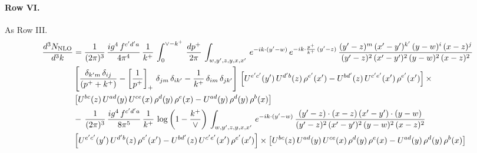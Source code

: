 \documentclass[10pt]{article}
\numberwithin{equation}{section}
\begin{document}
\paragraph{Row VI.}
As Row III.
\begin{align}
    \frac{d^{3}N_{\rm NLO}}{d^{3}k} & =  \frac{1}{(2\pi)^{3}}\, \frac{ig^{4}\,f^{c'd'a}}{4\pi^{4}}\, \frac{1}{k^{+}}\,\int_{0}^{\vee-k^{+}}\, \frac{dp^{+}}{2\pi}\, \int_{w,y',z,y,x,x'}\, e^{-ik\cdot (y'-w)}\, e^{-ik\cdot \frac{p^{+}}{k^{+}}\,(y'-z)}\,\frac{(y'-z)^{m}\,(x'-y')^{k'}\,(y-w)^{i}\,(x-z)^{j}}{(y'-z)^{2}\,(x'-y')^{2}\,(y-w)^{2}\,(x-z)^{2}}\notag \\ & \left[\frac{\delta_{k'm}\,\delta_{ij}}{(p^{+}+k^{+})}-\left[\frac{1}{p^{+}}\right]_{+}\,\delta_{jm}\,\delta_{ik'}-\frac{1}{k^{+}}\, \delta_{im}\, \delta_{jk'}\right]\, \left[U^{e'c'}(y')\,U^{d'b}(z)\,\rho^{e'}(x')-U^{bd'}(z)\,U^{c'e'}(x')\,\rho^{e'}(x')\right]\times\notag \\ &  \left[U^{bc}(z)\,U^{ad}(y)\,U^{ce}(x)\,\rho^{d}(y)\,\rho^{e}(x)-U^{ad}(y)\,\rho^{d}(y)\,\rho^{b}(x)\right] \notag \\
&  -\,\frac{1}{(2\pi)^{3}}\, \frac{ig^{4}\,f^{c'd'a}}{8\pi^{5}}\, \frac{1}{k^{+}}\,\log{\left(1-\frac{k^{+}}{\vee}\right)}\, \int_{w,y',z,y,x,x'}\, e^{-ik\cdot (y'-w)}\,\frac{(y'-z)\cdot (x-z)\,(x'-y')\cdot (y-w)}{(y'-z)^{2}\,(x'-y')^{2}\,(y-w)^{2}\,(x-z)^{2}}\notag \\ & \left[U^{e'c'}(y')\,U^{d'b}(z)\,\rho^{e'}(x')-U^{bd'}(z)\,U^{c'e'}(x')\,\rho^{e'}(x')\right]\times  \left[U^{bc}(z)\,U^{ad}(y)\,U^{ce}(x)\,\rho^{d}(y)\,\rho^{e}(x)-U^{ad}(y)\,\rho^{d}(y)\,\rho^{b}(x)\right] \label{eq:R:G3VI}
\end{align}
\end{document}

